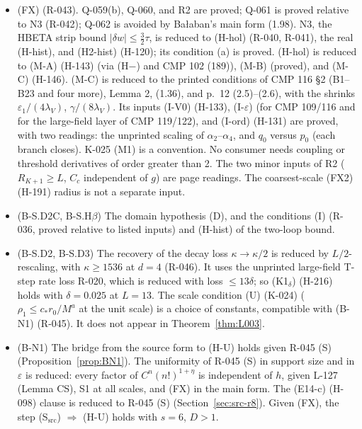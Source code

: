 \begin{itemize}
\item (FX) (R-043). Q-059(b), Q-060, and R2 are proved; Q-061 is proved relative to N3 (R-042); Q-062 is avoided by Ba{\l}aban's main form (1.98). N3, the HBETA strip bound $|\delta w|\le\tfrac32\tau$, is reduced to (H-hol) (R-040, R-041), the real (H-hist), and (H2-hist) (H-120); its condition (a) is proved. (H-hol) is reduced to (M-A) (H-143) (via (H$-$) and CMP 102 (189)), (M-B) (proved), and (M-C) (H-146). (M-C) is reduced to the printed conditions of CMP 116 \S2 (B1--B23 and four more), Lemma 2, (1.36), and p.\ 12 (2.5)--(2.6), with the shrinks $\varepsilon_1/(4\lambda_V)$, $\gamma/(8\lambda_V)$. Its inputs (I-V0) (H-133), (I-$\varepsilon$) (for CMP 109/116 and for the large-field layer of CMP 119/122), and (I-ord) (H-131) are proved, with two readings: the unprinted scaling of $\alpha_2$--$\alpha_4$, and $q_0$ versus $p_0$ (each branch closes). K-025 (M1) is a convention. No consumer needs coupling or threshold derivatives of order greater than 2. The two minor inputs of R2 ($R_{K+1}\ge L$, $C_c$ independent of $g$) are page readings. The coarsest-scale (FX2) (H-191) radius is not a separate input.
\item (B-S.D2C, B-S.H$\beta$) The domain hypothesis (D), and the conditions (I) (R-036, proved relative to listed inputs) and (H-hist) of the two-loop bound.
\item (B-S.D2, B-S.D3) The recovery of the decay loss $\kappa\to\kappa/2$ is reduced by $L/2$-rescaling, with $\kappa\ge1536$ at $d=4$ (R-046). It uses the unprinted large-field T-step rate loss R-020, which is reduced with loss $\le13\delta$; so (K1$_\delta$) (H-216) holds with $\delta=0.025$ at $L=13$. The scale condition (U) (K-024) ($\rho_1\le c_*r_0/M^a$ at the unit scale) is a choice of constants, compatible with (B-N1) (R-045). It does not appear in Theorem~\ref{thm:L003}.
\item (B-N1) The bridge from the source form to (H-U) holds given R-045 (S) (Proposition~\ref{prop:BN1}). The uniformity of R-045 (S) in support size and in $\varepsilon$ is reduced: every factor of $C^n(n!)^{1+\eta}$ is independent of $h$, given L-127 (Lemma CS), S1 at all scales, and (FX) in the main form. The (E14-c) (H-098) clause is reduced to R-045 (S) (Section~\ref{sec:src-r8}). Given (FX), the step (S$_{\mathrm{src}}$) $\Rightarrow$ (H-U) holds with $s=6$, $D>1$.
\end{itemize}

